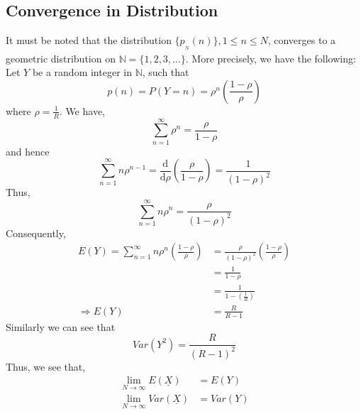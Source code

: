\begin{multicols}{2}
\section{Convergence in Distribution}\label{section-12}
It must be noted that the distribution  $\{p_{_{\underline{N}}}(n)\}, 1 \leq n \leq N$, converges to a geometric distribution on $\mathbb N = \{1,2,3, \ldots\}$. More precisely, we have the following:\\
Let $Y$ be a random integer in $\mathbb N$, such that
\begin{equation}
p(n) = P(Y=n) = \rho^n \left(\displaystyle{\frac{1-\rho}{\rho}}\right)\label{eq-12.1} 
\end{equation}
where $\rho = \displaystyle{\frac{1}{R}}$.
We have, 
\begin{equation}
\displaystyle{\sum_{n=1}^{\infty}\rho^n} = \displaystyle{\frac{\rho}{1-\rho}}\label{eq-12.2}
\end{equation}
and hence
\begin{equation} \nonumber
\displaystyle{\sum_{n=1}^{\infty}n\rho^{n-1}} = \frac{\mathrm{d}}{\mathrm{d}\rho}\left(\displaystyle{\frac{\rho}{1-\rho}}\right) =  \displaystyle{\frac{1}{(1-\rho)^2}}
\end{equation}
Thus,
\begin{equation}\nonumber
\displaystyle{\sum_{n=1}^{\infty}n\rho^{n}} = \displaystyle{\frac{\rho}{(1-\rho)^2}}
\end{equation}
Consequently,
\begin{align}
E(Y) = \displaystyle{\sum_{n=1}^{\infty}n\rho^{n}}\left(\displaystyle{\frac{1-\rho}{\rho}}\right) &= \displaystyle{\frac{\rho}{(1-\rho)^2}}\left(\displaystyle{\frac{1-\rho}{\rho}}\right)\nonumber\\
 &= \displaystyle{\frac{1}{1-\rho}}\nonumber\\
 &= \displaystyle{\frac{1}{1-\displaystyle{\left(\frac{1}{R}\right)}}}\nonumber\\
\Rightarrow E(Y) &= \displaystyle{\frac{R}{R-1}}\label{eq-12.3}
\end{align}
Similarly we can see that 
\begin{equation}
Var(Y^2) = \displaystyle{\frac{R}{(R-1)^2}}\label{eq-12.4}
\end{equation}
Thus, we see that,
\begin{align}
\displaystyle{\lim_{N \rightarrow \infty}}E(\underline{X}) &= E(Y)\nonumber\\
\displaystyle{\lim_{N \rightarrow \infty}}Var(\underline{X}) &= Var(Y)\nonumber
\end{align}

\end{multicols}
